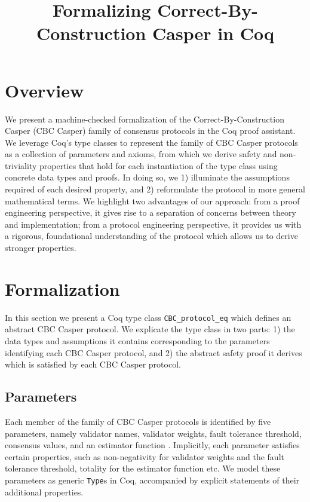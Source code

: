 \documentclass[runningheads]{llncs}
\begin{document}
	
\title{Formalizing Correct-By-Construction Casper in Coq}


\maketitle

\section{Overview}

We present a machine-checked formalization of the Correct-By-Construction Casper (CBC Casper) family of consensus protocols in the Coq proof assistant. We leverage Coq's type classes to represent the family of CBC Casper protocols as a collection of parameters and axioms, from which we derive safety and non-triviality properties that hold for each instantiation of the type class using concrete data types and proofs. In doing so, we 1) illuminate the assumptions required of each desired property, and 2) reformulate the protocol in more general mathematical terms. We highlight two advantages of our approach: from a proof engineering perspective, it gives rise to a separation of concerns between theory and implementation; from a protocol engineering perspective, it provides us with a rigorous, foundational understanding of the protocol which allows us to derive stronger properties. 

\section{Formalization} 
In this section we present a Coq type class \verb|CBC_protocol_eq| which defines an abstract CBC Casper protocol. We explicate the type class in two parts: 1) the data types and assumptions it contains corresponding to the parameters identifying each CBC Casper protocol, and 2) the abstract safety proof it derives which is satisfied by each CBC Casper protocol. 
\subsection{Parameters} 
Each member of the family of CBC Casper protocols is identified by five parameters, namely validator names, validator weights, fault tolerance threshold, consensus values, and an estimator function \cite{CBCfull}. Implicitly, each parameter satisfies certain properties, such as non-negativity for validator weights and the fault tolerance threshold, totality for the estimator function etc. We model these parameters as generic \verb|Type|s in Coq, accompanied by explicit statements of their additional properties. 
\end{document}
